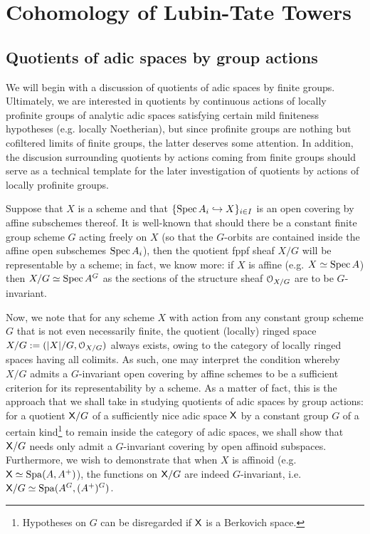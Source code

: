 \section{Cohomology of Lubin-Tate Towers}
    \subsection{Quotients of adic spaces by group actions}
        We will begin with a discussion of quotients of adic spaces by finite groups. Ultimately, we are interested in quotients by continuous actions of locally profinite groups of analytic adic spaces satisfying certain mild finiteness hypotheses (e.g. locally Noetherian), but since profinite groups are nothing but cofiltered limits of finite groups, the latter deserves some attention. In addition, the discusion surrounding quotients by actions coming from finite groups should serve as a technical template for the later investigation of quotients by actions of locally profinite groups. 
        
        Suppose that $X$ is a scheme and that $\{\operatorname{Spec} A_i \hookrightarrow X\}_{i \in I}$ is an open covering by affine subschemes thereof. It is well-known that should there be a constant finite group scheme $G$ acting freely on $X$ (so that the $G$-orbits are contained inside the affine open subschemes $\operatorname{Spec} A_i$), then the quotient fppf sheaf $X/G$ will be representable by a scheme; in fact, we know more: if $X$ is affine (e.g. $X \simeq \operatorname{Spec} A$) then $X/G \simeq \operatorname{Spec} A^G$ as the sections of the structure sheaf $\mathcal{O}_{X/G}$ are to be $G$-invariant. 
            
        Now, we note that for any scheme $X$ with action from any constant group scheme $G$ that is not even necessarily finite, the quotient (locally) ringed space $X/G := (|X|/G, \mathcal{O}_{X/G})$ always exists, owing to the category of locally ringed spaces having all colimits. As such, one may interpret the condition whereby $X/G$ admits a $G$-invariant open covering by affine schemes to be a sufficient criterion for its representability by a scheme. As a matter of fact, this is the approach that we shall take in studying quotients of adic spaces by group actions: for a quotient $\mathsf{X}/G$ of a sufficiently nice adic space $\mathsf{X}$ by a constant group $G$ of a certain kind\footnote{Hypotheses on $G$ can be disregarded if $\mathsf{X}$ is a Berkovich space.} to remain inside the category of adic spaces, we shall show that $\mathsf{X}/G$ needs only admit a $G$-invariant covering by open affinoid subspaces. Furthermore, we wish to demonstrate that when $X$ is affinoid (e.g. $\mathsf{X} \simeq \operatorname{Spa}(A, A^+)$), the functions on $\mathsf{X}/G$ are indeed $G$-invariant, i.e. $\mathsf{X}/G \simeq \operatorname{Spa}(A^G, (A^+)^G)$. 
        
